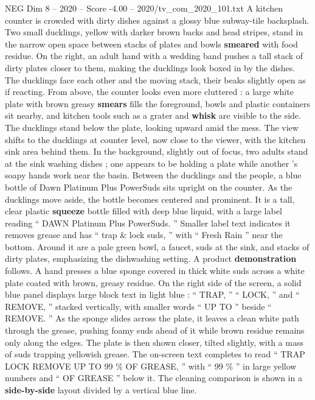 \begin{textsample}{NEG Dim 8 – 2020 – Score -4.00 – 2020/tv\_com\_2020\_101.txt}  \label{ex:f8_neg_045}
A kitchen counter is crowded with dirty dishes against a glossy blue subway-tile backsplash.
Two small ducklings, yellow with darker brown backs and head stripes, stand in the narrow open space between stacks of plates and bowls \textbf{smeared} with food residue.
On the right, an adult hand with a wedding band pushes a tall stack of dirty plates closer to them, making the ducklings look boxed in by the dishes.
The ducklings face each other and the moving stack, their beaks slightly open as if reacting.
From above, the counter looks even more cluttered : a large white plate with brown greasy \textbf{smears} fills the foreground, bowls and plastic containers sit nearby, and kitchen tools such as a grater and \textbf{whisk} are visible to the side.
The ducklings stand below the plate, looking upward amid the mess.
The view shifts to the ducklings at counter level, now close to the viewer, with the kitchen sink area behind them.
In the background, slightly out of focus, two adults stand at the sink washing dishes ; one appears to be holding a plate while another ’s soapy hands work near the basin.
Between the ducklings and the people, a blue bottle of Dawn Platinum Plus PowerSuds sits upright on the counter.
As the ducklings move aside, the bottle becomes centered and prominent.
It is a tall, clear plastic \textbf{squeeze} bottle filled with deep blue liquid, with a large label reading “ DAWN Platinum Plus PowerSuds. ” Smaller label text indicates it removes grease and has “ trap \& lock suds, ” with “ Fresh Rain ” near the bottom.
Around it are a pale green bowl, a faucet, suds at the sink, and stacks of dirty plates, emphasizing the dishwashing setting.
A product \textbf{demonstration} follows.
A hand presses a blue sponge covered in thick white suds across a white plate coated with brown, greasy residue.
On the right side of the screen, a solid blue panel displays large block text in light blue : “ TRAP, ” “ LOCK, ” and “ REMOVE, ” stacked vertically, with smaller words “ UP TO ” beside “ REMOVE. ” As the sponge slides across the plate, it leaves a clean white path through the grease, pushing foamy suds ahead of it while brown residue remains only along the edges.
The plate is then shown closer, tilted slightly, with a mass of suds trapping yellowish grease.
The on-screen text completes to read “ TRAP LOCK REMOVE UP TO 99 \% OF GREASE, ” with “ 99 \% ” in large yellow numbers and “ OF GREASE ” below it.
The cleaning comparison is shown in a \textbf{side-by-side} layout divided by a vertical blue line.

\end{textsample}
